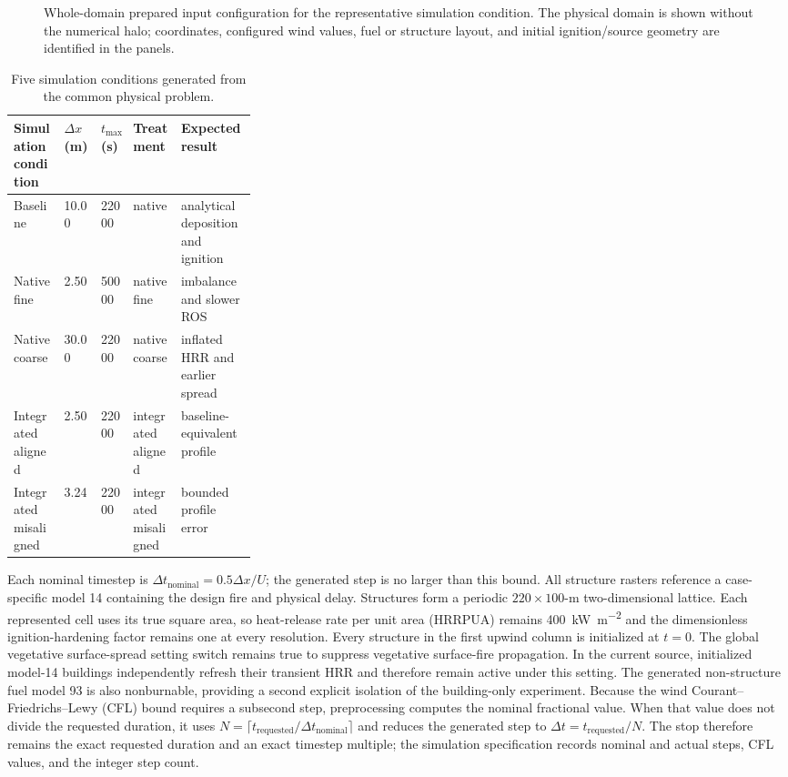 \begin{figure}[H]
\centering
{}
\caption{Whole-domain prepared input configuration for the representative simulation condition.  The
physical domain is shown without the numerical halo; coordinates, configured wind values,
fuel or structure layout, and initial ignition/source geometry are identified in the panels.}
\label{fig:input-configuration}
\end{figure}

\begin{table}[H]
\centering\small
\caption{Five simulation conditions generated from the common physical problem.}
\begin{tabular}{llllp{0.31\linewidth}}
\toprule
Simulation condition & \(\Delta x\) (m) & \(t_{\max}\) (s) & Treatment & Expected result\\
\midrule
Baseline & 10.00 & 22000 & native & analytical deposition and ignition\\
Native fine & 2.50 & 50000 & native fine & imbalance and slower ROS\\
Native coarse & 30.00 & 22000 & native coarse & inflated HRR and earlier spread\\
Integrated aligned & 2.50 & 22000 & integrated aligned & baseline-equivalent profile\\
Integrated misaligned & 3.24 & 22000 & integrated misaligned & bounded profile error\\
\bottomrule
\end{tabular}
\end{table}

Each nominal timestep is \(\Delta t_{\mathrm{nominal}}=0.5\Delta x/U\); the generated step is no larger than this bound. All structure rasters reference
a case-specific model 14 containing the design fire and physical delay. Structures
form a periodic \(220\times100\)-m two-dimensional lattice. Each represented
cell uses its true square area, so heat-release rate per unit area (HRRPUA) remains \SI{400}{kW.m^{-2}} and the
dimensionless ignition-hardening factor remains one at every resolution. Every
structure in the first upwind column is initialized at \(t=0\).
The global vegetative surface-spread setting switch remains true to suppress vegetative surface-fire propagation.  In the current source, initialized model-14 buildings independently refresh their transient HRR and therefore remain active under this setting.  The generated non-structure fuel model 93 is also nonburnable, providing a second explicit isolation of the building-only experiment.
Because the wind Courant--Friedrichs--Lewy (CFL) bound requires a subsecond step, preprocessing computes the
nominal fractional value.  When that value does not divide the requested duration,
it uses \(N=\lceil t_{\mathrm{requested}}/\Delta t_{\mathrm{nominal}}\rceil\)
and reduces the generated step to
\(\Delta t=t_{\mathrm{requested}}/N\).  The stop therefore remains the exact
requested duration and an exact timestep multiple; the simulation specification records nominal
and actual steps, CFL values, and the integer step count.

